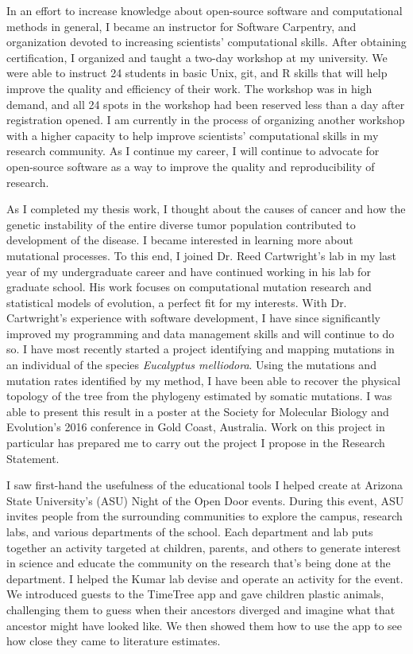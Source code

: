 \documentclass[12pt]{article}
\begin{document}
In an effort to increase knowledge about open-source software and computational methods in general, I became an instructor for Software Carpentry, and organization devoted to increasing scientists' computational skills. After obtaining certification, I organized and taught a two-day workshop at my university. We were able to instruct 24 students in basic Unix, git, and R skills that will help improve the quality and efficiency of their work. The workshop was in high demand, and all 24 spots in the workshop had been reserved less than a day after registration opened. I am currently in the process of organizing another workshop with a higher capacity to help improve scientists' computational skills in my research community.
As I continue my career, I will continue to advocate for open-source software as a way to improve the quality and reproducibility of research.

As I completed my thesis work, I thought about the causes of cancer and how the genetic instability of the entire diverse tumor population contributed to development of the disease. I became interested in learning more about mutational processes. To this end, I joined Dr. Reed Cartwright's lab in my last year of my undergraduate career and have continued working in his lab for graduate school. His work focuses on computational mutation research and statistical models of evolution, a perfect fit for my interests. With Dr. Cartwright's experience with software development, I have since significantly improved my programming and data management skills and will continue to do so. I have most recently started a project identifying and mapping mutations in an individual of the species \textit{Eucalyptus melliodora}. Using the mutations and mutation rates identified by my method, 
I have been able to recover the physical topology of the tree from the phylogeny estimated by somatic mutations. I was able to present this result in a poster at the Society for Molecular Biology and Evolution's 2016 conference in Gold Coast, Australia.
Work on this project in particular has prepared me to carry out the project I propose in the Research Statement.

I saw first-hand the usefulness of the educational tools I helped create at Arizona State University's (ASU)
Night of the Open Door events. During this event, ASU invites people from the surrounding communities to explore the campus, research labs, and various departments of the school. Each department and lab puts together an activity targeted at children, parents, and others to generate interest in science and educate the community on the research that's being done at the department. I helped the Kumar lab devise and operate an activity for the event. We introduced guests to the TimeTree app and gave children plastic animals, challenging them to guess when their ancestors diverged and imagine what that ancestor might have looked like. We then showed them how to use the app to see how close they came to literature estimates.
\end{document}
